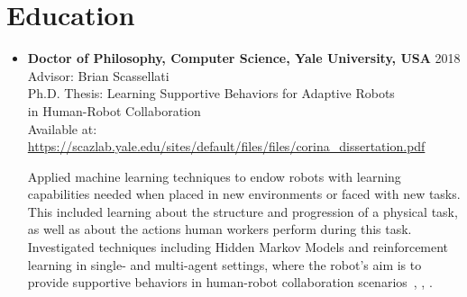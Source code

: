 \documentclass[10pt,letterpaper]{article}
\newcommand{\thing}[2]{{#1} \hfill {#2}}
\begin{document}
\section{Education}
\vspace{-0.5em}
\begin{itemize}%
\item \thing{\bf Doctor of Philosophy, Computer Science, Yale University, USA}{2018}\\
	Advisor: Brian Scassellati\\
	Ph.D. Thesis: Learning Supportive Behaviors for Adaptive Robots \\
	\hphantom{Area of study:} in Human-Robot Collaboration \\
	Available at: \href{https://scazlab.yale.edu/sites/default/files/files/corina_dissertation.pdf}{\url{https://scazlab.yale.edu/sites/default/files/files/corina_dissertation.pdf}}
	
	Applied machine learning techniques to endow robots with learning capabilities needed when placed in new environments or faced with new tasks. This included learning about the structure and progression of a physical task, as well as about the actions human workers perform during this task. Investigated techniques including Hidden Markov Models and reinforcement learning in single- and multi-agent settings, where the robot's aim is to provide supportive behaviors in human-robot collaboration scenarios~\cite{grigore2018pref_assistance}, \cite{grigore2017granularity}, \cite{grigore2016hmarl}.


\end{itemize}
\end{document}
